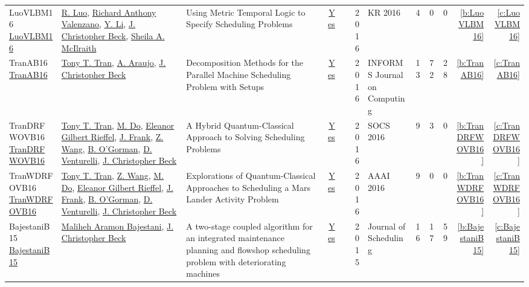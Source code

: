 {\begin{longtable}{>{\raggedright\arraybackslash}p{3cm}>{\raggedright\arraybackslash}p{6cm}>{\raggedright\arraybackslash}p{6.5cm}rrrp{2.5cm}rrrrr}
LuoVLBM16 \href{http://www.aaai.org/ocs/index.php/KR/KR16/paper/view/12909}{LuoVLBM16} & \hyperref[auth:a825]{R. Luo}, \hyperref[auth:a826]{Richard Anthony Valenzano}, \hyperref[auth:a827]{Y. Li}, \hyperref[auth:a89]{J. Christopher Beck}, \hyperref[auth:a828]{Sheila A. McIlraith} & Using Metric Temporal Logic to Specify Scheduling Problems & \href{works/LuoVLBM16.pdf}{Yes} & \cite{LuoVLBM16} & 2016 & KR 2016 & 4 & 0 & 0 & \ref{b:LuoVLBM16} & \ref{c:LuoVLBM16}\\
TranAB16 \href{https://doi.org/10.1287/ijoc.2015.0666}{TranAB16} & \hyperref[auth:a811]{Tony T. Tran}, \hyperref[auth:a819]{A. Araujo}, \hyperref[auth:a89]{J. Christopher Beck} & Decomposition Methods for the Parallel Machine Scheduling Problem with Setups & \href{works/TranAB16.pdf}{Yes} & \cite{TranAB16} & 2016 & INFORMS Journal on Computing & 13 & 72 & 28 & \ref{b:TranAB16} & \ref{c:TranAB16}\\
TranDRFWOVB16 \href{https://doi.org/10.1609/socs.v7i1.18390}{TranDRFWOVB16} & \hyperref[auth:a811]{Tony T. Tran}, \hyperref[auth:a821]{M. Do}, \hyperref[auth:a822]{Eleanor Gilbert Rieffel}, \hyperref[auth:a385]{J. Frank}, \hyperref[auth:a820]{Z. Wang}, \hyperref[auth:a823]{B. O'Gorman}, \hyperref[auth:a824]{D. Venturelli}, \hyperref[auth:a89]{J. Christopher Beck} & A Hybrid Quantum-Classical Approach to Solving Scheduling Problems & \href{works/TranDRFWOVB16.pdf}{Yes} & \cite{TranDRFWOVB16} & 2016 & SOCS 2016 & 9 & 3 & 0 & \ref{b:TranDRFWOVB16} & \ref{c:TranDRFWOVB16}\\
TranWDRFOVB16 \href{http://www.aaai.org/ocs/index.php/WS/AAAIW16/paper/view/12664}{TranWDRFOVB16} & \hyperref[auth:a811]{Tony T. Tran}, \hyperref[auth:a820]{Z. Wang}, \hyperref[auth:a821]{M. Do}, \hyperref[auth:a822]{Eleanor Gilbert Rieffel}, \hyperref[auth:a385]{J. Frank}, \hyperref[auth:a823]{B. O'Gorman}, \hyperref[auth:a824]{D. Venturelli}, \hyperref[auth:a89]{J. Christopher Beck} & Explorations of Quantum-Classical Approaches to Scheduling a Mars Lander Activity Problem & \href{works/TranWDRFOVB16.pdf}{Yes} & \cite{TranWDRFOVB16} & 2016 & AAAI 2016 & 9 & 0 & 0 & \ref{b:TranWDRFOVB16} & \ref{c:TranWDRFOVB16}\\
BajestaniB15 \href{https://doi.org/10.1007/s10951-015-0416-2}{BajestaniB15} & \hyperref[auth:a829]{Maliheh Aramon Bajestani}, \hyperref[auth:a89]{J. Christopher Beck} & A two-stage coupled algorithm for an integrated maintenance planning and flowshop scheduling problem with deteriorating machines & \href{works/BajestaniB15.pdf}{Yes} & \cite{BajestaniB15} & 2015 & Journal of Scheduling & 16 & 17 & 59 & \ref{b:BajestaniB15} & \ref{c:BajestaniB15}\\

\end{longtable}}

